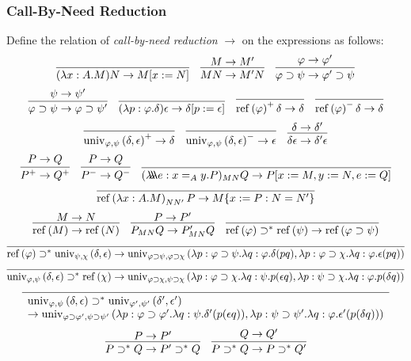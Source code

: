 \documentclass[a4paper,UKenglish]{lipics-v2016}
\newcommand*{\reff}[1]{\ensuremath{\mathrm{ref} \left( {#1} \right)}}
\newcommand*{\univ}[4]{\ensuremath{\mathrm{univ}_{{#1}, {#2}} \left({#3} , {#4} \right)}}
\newcommand*{\triplelambda}{\ensuremath{\lambda \!\! \lambda \!\! \lambda}}
\theoremstyle{plain}
\theoremstyle{definition}
\begin{document}
\subsubsection{Call-By-Need Reduction}

\begin{definition}
Define the relation of \emph{call-by-need reduction} $\rightarrow$ on the expressions as follows:
$$ \infer{(\lambda x:A.M)N \rightarrow M[x:=N]}{} \quad
\infer{MN \rightarrow M'N}{M \rightarrow M'} \quad
\infer{\varphi \supset \psi \rightarrow \varphi' \supset \psi}{\varphi \rightarrow \varphi'} $$
$$ \infer{\varphi \supset \psi \rightarrow \varphi \supset \psi'}{\psi \rightarrow \psi'} \quad
\infer{(\lambda p : \varphi . \delta)\epsilon \rightarrow \delta [ p := \epsilon ]}{} \quad
\infer{\reff{\varphi}^+ \delta \rightarrow \delta}{} \quad
\infer{\reff{\varphi}^- \delta \rightarrow \delta}{} $$
$$ \infer{\univ{\varphi}{\psi}{\delta}{\epsilon}^+ \rightarrow \delta}{} \quad
\infer{\univ{\varphi}{\psi}{\delta}{\epsilon}^- \rightarrow \epsilon}{} \quad
\infer{\delta \epsilon \rightarrow \delta' \epsilon}{\delta \rightarrow \delta'} $$
$$ \infer{P^+ \rightarrow Q^+}{P \rightarrow Q} \quad
\infer{P^- \rightarrow Q^-}{P \rightarrow Q} \quad
\infer{(\triplelambda e:x =_A y.P)_{MN} Q \rightarrow P [x := M, y := N, e := Q]}{} $$
$$ \infer{\reff{\lambda x:A.M}_{N N'} P \rightarrow M \{ x:=P : N = N' \}}{} $$
$$ \infer{\reff{M} \rightarrow \reff{N}}{M \rightarrow N} \quad
\infer{P_{MN} Q \rightarrow P'_{MN} Q}{P \rightarrow P'} \quad
\infer{\reff{\varphi} \supset^* \reff{\psi} \rightarrow \reff{\varphi \supset \psi}}{} $$
$$ \infer{\reff{\varphi} \supset^* \univ{\psi}{\chi}{\delta}{\epsilon} \rightarrow 
\univ{\varphi \supset \psi}{\varphi \supset \chi}{\lambda p:\varphi \supset \psi. \lambda q : \varphi. \delta (pq)}{\lambda p : \varphi \supset \chi. \lambda q : \varphi. \epsilon (pq)}}{} $$
$$ \infer{\univ{\varphi}{\psi}{\delta}{\epsilon} \supset^* \reff{\chi} \rightarrow
\univ{\varphi \supset \chi}{\psi \supset \chi}{\lambda p : \varphi \supset \chi. \lambda q : \psi. p (\epsilon q)}{\lambda p:\psi \supset \chi. \lambda q : \varphi. p(\delta q)}}{} $$
$$ \infer{\begin{array}{l}
\univ{\varphi}{\psi}{\delta}{\epsilon} \supset^* \univ{\varphi'}{\psi'}{\delta'}{\epsilon'} \\
 \rightarrow
\univ{\varphi \supset \varphi'}{\psi \supset \psi'}{\lambda p : \varphi \supset \varphi'. \lambda q : \psi. \delta' (p(\epsilon q))}{\lambda p : \psi \supset \psi'. \lambda q : \varphi. \epsilon' (p (\delta q))}
\end{array}}{} $$
$$ \infer{P \supset^* Q \rightarrow P' \supset^* Q}{P \rightarrow P'} \quad
\infer{P \supset^* Q \rightarrow P \supset^* Q'}{Q \rightarrow Q'} $$
\end{definition}
\end{document}
